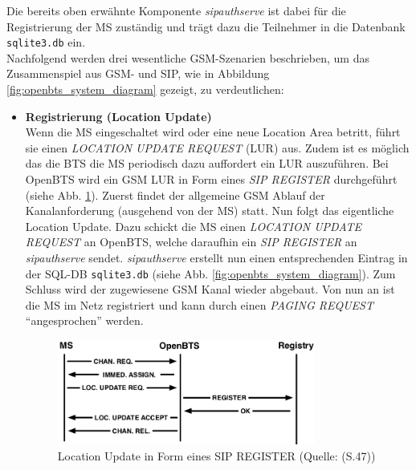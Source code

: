 Die bereits oben erwähnte Komponente \textit{sipauthserve} ist dabei für die Registrierung der MS zuständig und trägt dazu  die Teilnehmer in die Datenbank \verb|sqlite3.db| ein.\\ 
Nachfolgend werden drei wesentliche GSM-Szenarien beschrieben, um das Zusammenspiel aus GSM- und SIP, wie in Abbildung \ref{fig:openbts_system_diagram} gezeigt, zu verdeutlichen:
\begin{itemize}
\item \textbf{Registrierung (Location Update)}\\
Wenn die MS eingeschaltet wird oder eine neue Location Area betritt, führt sie einen \textit{LOCATION UPDATE REQUEST} (LUR) aus. Zudem ist es möglich das die BTS die MS periodisch dazu auffordert ein LUR auszuführen. Bei OpenBTS wird ein GSM LUR in Form eines \textit{SIP REGISTER} durchgeführt (siehe Abb. \ref{fig:openbts_registration}). Zuerst findet der allgemeine GSM Ablauf der Kanalanforderung (ausgehend von der MS) statt. Nun folgt das eigentliche Location Update. Dazu schickt die MS einen \textit{LOCATION UPDATE REQUEST} an OpenBTS, welche daraufhin ein \textit{SIP REGISTER} an \textit{sipauthserve} sendet. \textit{sipauthserve} erstellt nun einen entsprechenden Eintrag in der SQL-DB \verb|sqlite3.db| (siehe Abb. \ref{fig:openbts_system_diagram}). Zum Schluss wird der zugewiesene GSM Kanal wieder abgebaut. Von nun an ist die MS im Netz registriert und kann durch einen \textit{PAGING REQUEST} "`angesprochen"' werden.
\begin{figure}[h]
	\centering
		\includegraphics[width=0.80\textwidth]{img/openbts_registration.png}
	\caption{Location Update in Form eines SIP REGISTER (Quelle: \cite{bib:openbtsmanual}(S.47))}
	\label{fig:openbts_registration}
\end{figure}
\end{itemize}
